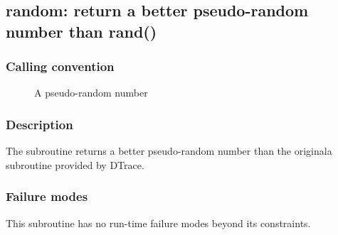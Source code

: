 \clearpage
{}
{}
\label{subr:random}
\subsection*{random: return a better pseudo-random number than rand()}

\subsubsection*{Calling convention}

\begin{description}
\item[] A pseudo-random number
\end{description}

\subsubsection*{Description}

The  subroutine returns a better pseudo-random
number than the originala  subroutine provided by DTrace.

\subsubsection*{Failure modes}

This subroutine has no run-time failure modes beyond its constraints.
